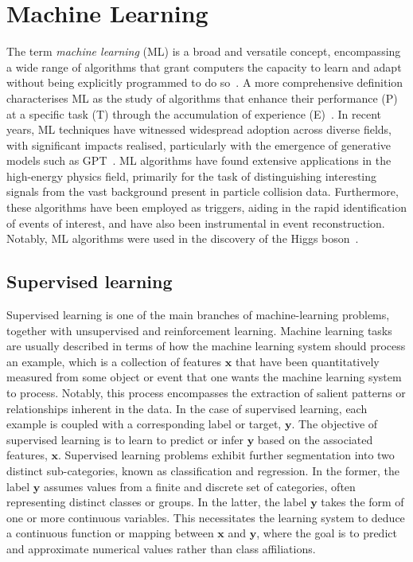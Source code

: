 \chapter{Machine Learning}

The term \emph{machine learning} (ML) is a broad and versatile concept, encompassing a wide range of algorithms that grant computers the capacity to learn and adapt without being explicitly programmed to do so~\cite{5392560}. A more comprehensive definition characterises ML as the study of algorithms that enhance their performance (P) at a specific task (T) through the accumulation of experience (E)~\cite{mitchell1997machine}. In recent years, ML techniques have witnessed widespread adoption across diverse fields, with significant impacts realised, particularly with the emergence of generative models such as GPT~\cite{openai2023gpt4}.
ML algorithms have found extensive applications in the high-energy physics field, primarily for the task of distinguishing interesting signals from the vast background present in particle collision data. Furthermore, these algorithms have been employed as triggers, aiding in the rapid identification of events of interest, and have also been instrumental in event reconstruction. Notably, ML algorithms were used in the discovery of the Higgs boson~\cite{CMS:2012qbp}.

\section{Supervised learning}
Supervised learning is one of the main branches of machine-learning problems, together with unsupervised and reinforcement learning. Machine learning tasks are usually described in terms of how the machine learning system should process an example, which is a collection of features $\mathbf{x}$ that have been quantitatively measured from some object or event that one wants the machine learning system to process.  Notably, this process encompasses the extraction of salient patterns or relationships inherent in the data. In the case of supervised learning, each example is coupled with a corresponding label or target, $\mathbf{y}$. The objective of supervised learning is to learn to predict or infer $\mathbf{y}$ based on the associated features, $\mathbf{x}$.
Supervised learning problems exhibit further segmentation into two distinct sub-categories, known as classification and regression. In the former, the label $\mathbf{y}$ assumes values from a finite and discrete set of categories, often representing distinct classes or groups. In the latter, the label $\mathbf{y}$ takes the form of one or more continuous variables. This necessitates the learning system to deduce a continuous function or mapping between $\mathbf{x}$ and $\mathbf{y}$, where the goal is to predict and approximate numerical values rather than class affiliations.

